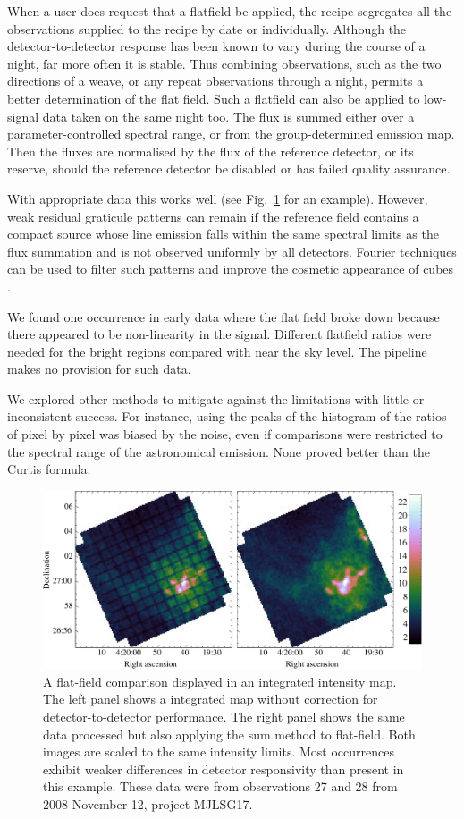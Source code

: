 \documentclass[a4paper,fleqn,usenatbib]{mnras}
\begin{document}
When a user does request that a flatfield be applied, the recipe
segregates all the observations supplied to the recipe by date or
individually.  Although the detector-to-detector response has been
known to vary during the course of a night, far more often it is
stable.  Thus combining observations, such as the two directions of a
weave, or any repeat observations through a night, permits a better
determination of the flat field.  Such a flatfield can also be applied
to low-signal data taken on the same night too.  The flux is summed
either over a parameter-controlled spectral range, or from the
group-determined emission map.  Then the fluxes are normalised by the
flux of the reference detector, or its reserve, should the reference
detector be disabled or has failed quality assurance.

With appropriate data this works well (see
Fig.~\ref{fig:flatfield:results} for an example).  However, weak
residual graticule patterns can remain if the reference field contains
a compact source whose line emission falls within the same spectral
limits as the flux summation and is not observed uniformly by all
detectors.  Fourier techniques can be used to filter such patterns and
improve the cosmetic appearance of cubes \citep{2015MNRAS.447.1996W}.

We found one occurrence in early data where the flat field broke down
because there appeared to be non-linearity in the signal.  Different
flatfield ratios were needed for the bright regions compared with near
the sky level.  The pipeline makes no provision for such data.

We explored other methods to mitigate against the limitations with
little or inconsistent success.  For instance, using the peaks of the
histogram of the ratios of pixel by pixel was biased by the noise,
even if comparisons were restricted to the spectral range of the
astronomical emission.  None proved better than the Curtis formula.

\begin{figure}
\includegraphics[width=\textwidth]{12CO_flat_comparison}
\caption{A flat-field comparison displayed in an integrated intensity
  map.  The left panel shows a integrated map without correction for
  detector-to-detector performance.  The right panel shows the same
  data processed but also applying the sum method to flat-field.  Both
  images are scaled to the same intensity limits.  Most occurrences
  exhibit weaker differences in detector responsivity than present in
  this example. These data were from observations 27 and 28 from 2008
  November 12, project  MJLSG17.}
\label{fig:flatfield:results}
\end{figure}
\end{document}
